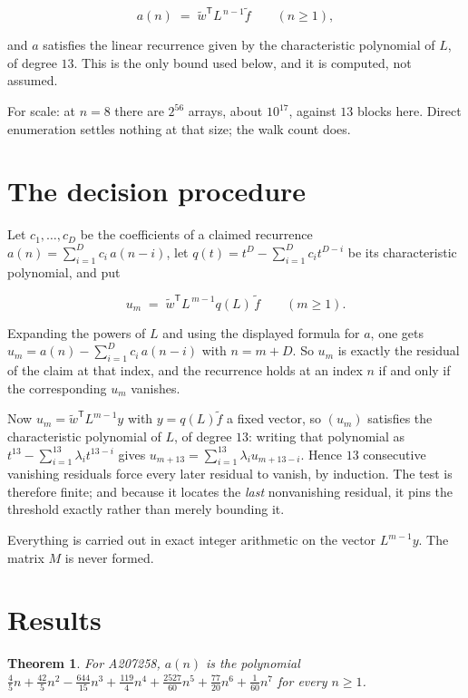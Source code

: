 \documentclass[11pt]{article}
\newtheorem{theorem}{Theorem}
\theoremstyle{definition}
\begin{document}
\[a(n) \;=\; \tilde w^{\mathsf T} L^{\,n-1} \tilde f \qquad (n \ge 1),\]

and $a$ satisfies the linear recurrence given by the characteristic polynomial of $L$, of degree $13$. This is the only bound used below, and it is computed, not assumed.

For scale: at $n = 8$ there are $2^{56}$ arrays, about $10^{17}$, against $13$ blocks here. Direct enumeration settles nothing at that size; the walk count does.

\section{The decision procedure}

Let $c_1,\dots,c_D$ be the coefficients of a claimed recurrence $a(n) = \sum_{i=1}^{D} c_i\,a(n-i)$, let $q(t) = t^{D} - \sum_{i=1}^{D} c_i t^{D-i}$ be its characteristic polynomial, and put

\[u_m \;=\; \tilde w^{\mathsf T} L^{\,m-1} q(L)\,\tilde f \qquad (m \ge 1).\]

Expanding the powers of $L$ and using the displayed formula for $a$, one gets $u_m = a(n) - \sum_{i=1}^{D} c_i\,a(n-i)$ with $n = m + D$. So $u_m$ is exactly the residual of the claim at that index, and the recurrence holds at an index $n$ if and only if the corresponding $u_m$ vanishes.

Now $u_m = \tilde w^{\mathsf T} L^{m-1} y$ with $y = q(L)\tilde f$ a fixed vector, so $(u_m)$ satisfies the characteristic polynomial of $L$, of degree $13$: writing that polynomial as $t^{13} - \sum_{i=1}^{13} \lambda_i t^{13-i}$ gives $u_{m+13} = \sum_{i=1}^{13} \lambda_i u_{m+13-i}$. Hence $13$ consecutive vanishing residuals force every later residual to vanish, by induction. The test is therefore finite; and because it locates the {\itshape last} nonvanishing residual, it pins the threshold exactly rather than merely bounding it.

Everything is carried out in exact integer arithmetic on the vector $L^{m-1}y$. The matrix $M$ is never formed.

\section{Results}

\begin{theorem} For A207258, $a(n)$ is the polynomial $\frac{4}{5}n + \frac{42}{5}n^{2} - \frac{644}{15}n^{3} + \frac{119}{4}n^{4} + \frac{2527}{60}n^{5} + \frac{77}{20}n^{6} + \frac{1}{60}n^{7}$ for every $n \ge 1$.\end{theorem}
\end{document}
